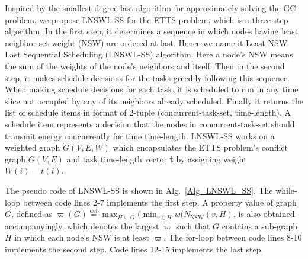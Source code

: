 \documentclass[12pt,journal,onecolumn,draftcls]{IEEEtran}
\begin{document}
Inspired by the smallest-degree-last algorithm \cite{Marathe1995} for approximately solving the GC problem, we propose LNSWL-SS for the ETTS problem, which is a three-step algorithm. In the first step, it determines a sequence in which nodes having least neighbor-set-weight (NSW) are ordered at last. Hence we name it Least NSW Last Sequential Scheduling (LNSWL-SS) algorithm. Here a node's NSW means the sum of the weights of the node's neighbors and itself. Then in the second step, it makes schedule decisions for the tasks greedily following this sequence. When making schedule decisions for each task, it is scheduled to run in any time slice not occupied by any of its neighbors already scheduled. Finally it returns the list of schedule items in format of 2-tuple (concurrent-task-set, time-length). A schedule item represents a decision that the nodes in concurrent-task-set should transmit energy concurrently for time time-length. LNSWL-SS works on a weighted graph $G(V,E,W)$ which encapsulates the ETTS problem's conflict graph $G(V,E)$ and task time-length vector \textbf{t} by assigning weight $W(i){=}t(i)$.

The pseudo code of LNSWL-SS is shown in Alg.~\ref{Alg_LNSWL_SS}. The while-loop between code lines 2-7 implements the first step. A property value of graph $G$, defined as $\varpi(G){\mathop{=}\limits^{\text{def}}}\max_{H{\subseteq}G}(\min_{v{\in}H}w(N_\text{NSW}(v,H)$, is also obtained accompanyingly, which denotes the largest $\varpi$ such that $G$ contains a sub-graph $H$ in which each node's NSW is at least $\varpi$. The for-loop between code lines 8-10 implements the second step. Code lines 12-15 implements the last step.
\end{document}
